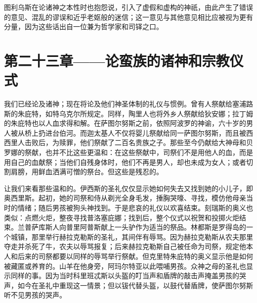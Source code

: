 \par

图利乌斯在论诸神之本性时也抱怨说，引入了虚假和虚构的神祇，由此产生了错误的意见、混乱的谬误和近乎老妪般的迷信；这一意见与其他意见相比应被视为更有分量，因为这些话出自一位兼为哲学家和司铎之口。\par


\section{第二十三章——论蛮族的诸神和宗教仪式}

我们已经论及诸神；现在将论及他们神圣体制的礼仪与惯例。曾有人祭献给塞浦路斯的朱庇特，如特乌克尔所规定。同样，陶里人也将外乡人祭献给狄安娜；拉丁姆的朱庇特也以人血求得和解。在萨图尔努斯之前，依照阿波罗的神谕，六十岁的男人被从桥上扔进台伯河。而迦太基人不仅将婴儿祭献给同一萨图尔努斯，而且被西西里人击败后，为赎罪，他们祭献了二百名贵族之子。那些至今仍献给大神母和贝罗娜的祭献，也并不比这些更温和：在这些祭献中，司祭们不是用他人的血，而是用自己的血献祭；当他们自残身体时，他们不再是男人，却也未成为女人；或者切割肩膀，用鲜血洒满可憎的祭台。但这些是残忍的。\par

让我们来看那些温和的。伊西斯的圣礼仅仅显示她如何失去又找到她的小儿子，即奥西里斯。起初，她的司祭和侍从剃光全身毛发，捶胸哭嚎、寻找，模仿他母亲当时的情绪；随后男孩被狗头神找到。于是悲哀的礼仪以欢喜结束。刻瑞斯的奥义也类似：点燃火炬，整夜寻找普洛塞庇娜；找到后，整个仪式以祝贺和投掷火炬结束。兰普萨库斯人向普里阿普斯献上一头驴作为适当的祭品。林都斯是罗得岛的一个城镇，那里举行赫拉克勒斯的圣礼，其间伴有辱骂。因为赫拉克勒斯从农夫那里夺走并杀死了牛，农夫以辱骂报复；后来赫拉克勒斯自己被任命为司祭，规定他本人和后来的司祭都要以同样的辱骂举行祭献。但克里特朱庇特的奥义显示他是如何被藏匿或养育的。山羊在他身旁，阿玛尔特亚以此喂哺男孩。众神之母的圣礼也显示同样的事。因为当时科里班忒斯以头盔的叮当声和盾牌的敲击声掩盖男孩的哭声，如今在圣礼中重现这一情景；但以钹代替头盔，以鼓代替盾牌，使萨图尔努斯听不见男孩的哭声。\par


